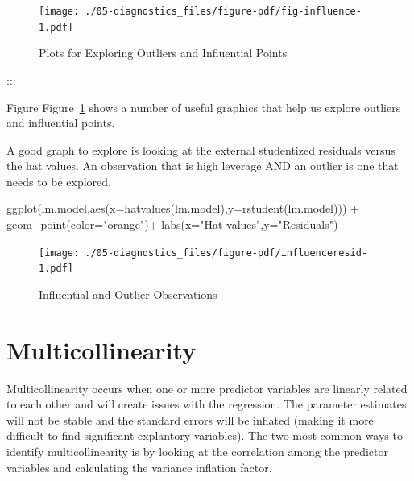\documentclass[
  letterpaper,
  DIV=11,
  numbers=noendperiod]{scrreprt}
\newenvironment{Shaded}{\begin{snugshade}}{\end{snugshade}}
\newcommand{\AttributeTok}[1]{\textcolor[rgb]{0.40,0.45,0.13}{#1}}
\newcommand{\FunctionTok}[1]{\textcolor[rgb]{0.28,0.35,0.67}{#1}}
\newcommand{\NormalTok}[1]{\textcolor[rgb]{0.00,0.23,0.31}{#1}}
\newcommand{\SpecialCharTok}[1]{\textcolor[rgb]{0.37,0.37,0.37}{#1}}
\newcommand{\StringTok}[1]{\textcolor[rgb]{0.13,0.47,0.30}{#1}}
\begin{document}
\begin{figure}[H]

{\centering \texttt{[image: ./05-diagnostics\_files/figure-pdf/fig-influence-1.pdf]}

}

\caption{\label{fig-influence}Plots for Exploring Outliers and
Influential Points}

\end{figure}

:::

Figure Figure~\ref{fig-influence} shows a number of useful graphics that
help us explore outliers and influential points.

A good graph to explore is looking at the external studentized residuals
versus the hat values. An observation that is high leverage AND an
outlier is one that needs to be explored.

\begin{Shaded}
\begin{Highlighting}[]
\FunctionTok{ggplot}\NormalTok{(lm.model,}\FunctionTok{aes}\NormalTok{(}\AttributeTok{x=}\FunctionTok{hatvalues}\NormalTok{(lm.model),}\AttributeTok{y=}\FunctionTok{rstudent}\NormalTok{(lm.model))) }\SpecialCharTok{+}  \FunctionTok{geom\_point}\NormalTok{(}\AttributeTok{color=}\StringTok{"orange"}\NormalTok{)}\SpecialCharTok{+} \FunctionTok{labs}\NormalTok{(}\AttributeTok{x=}\StringTok{"Hat values"}\NormalTok{,}\AttributeTok{y=}\StringTok{"Residuals"}\NormalTok{)}
\end{Highlighting}
\end{Shaded}

\begin{figure}[H]

{\centering \texttt{[image: ./05-diagnostics\_files/figure-pdf/influenceresid-1.pdf]}

}

\caption{Influential and Outlier Observations}

\end{figure}

\hypertarget{multicollinearity}{%
\section{Multicollinearity}\label{multicollinearity}}

Multicollinearity occurs when one or more predictor variables are
linearly related to each other and will create issues with the
regression. The parameter estimates will not be stable and the standard
errors will be inflated (making it more difficult to find significant
explantory variables). The two most common ways to identify
multicollinearity is by looking at the correlation among the predictor
variables and calculating the variance inflation factor.
\end{document}
